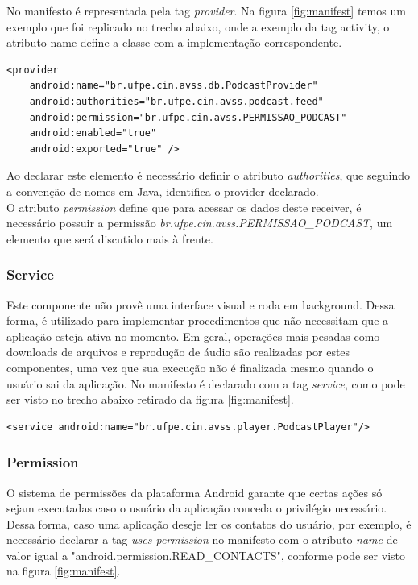 \documentclass[a4paper,12pt]{article}
\numberwithin{figure}{section}
\begin{document}
No manifesto é representada pela tag \textit{provider}. Na figura \ref{fig:manifest} temos um exemplo que foi replicado no trecho abaixo, onde a exemplo da tag activity, o atributo name define a classe com a implementação correspondente.
{\fontsize{9pt}{12pt}
\begin{verbatim}
<provider
    android:name="br.ufpe.cin.avss.db.PodcastProvider"
    android:authorities="br.ufpe.cin.avss.podcast.feed"
    android:permission="br.ufpe.cin.avss.PERMISSAO_PODCAST"
    android:enabled="true"
    android:exported="true" />
\end{verbatim}
}

Ao declarar este elemento é necessário definir o atributo \textit{authorities}, que seguindo a convenção de nomes em Java, identifica o provider declarado.\\

O atributo \textit{permission} define que para acessar os dados deste receiver, é necessário possuir a permissão \textit{br.ufpe.cin.avss.PERMISSAO\_PODCAST}, um elemento que será discutido mais à frente.




\subsubsection{Service}



Este componente não provê uma interface visual e roda em background. Dessa forma, é utilizado para implementar procedimentos  que não necessitam que a aplicação esteja ativa no momento. Em geral, operações mais pesadas como downloads de arquivos e reprodução de áudio são realizadas por estes componentes, uma vez que sua execução não é finalizada mesmo quando o usuário sai da aplicação. No manifesto é declarado com a tag \textit{service}, como pode ser visto no trecho abaixo retirado da figura \ref{fig:manifest}. 
{\fontsize{9pt}{12pt}
\begin{verbatim}
<service android:name="br.ufpe.cin.avss.player.PodcastPlayer"/>
\end{verbatim}
}

\subsubsection{Permission}
O sistema de permissões da plataforma Android garante que certas ações só sejam executadas caso o usuário da aplicação conceda o privilégio necessário. Dessa forma, caso uma aplicação deseje ler os contatos do usuário, por exemplo, é necessário declarar a tag \textit{uses-permission} no manifesto com o atributo \textit{name} de valor igual a "android.permission.READ\_CONTACTS", conforme pode ser visto na figura \ref{fig:manifest}.
\end{document}
